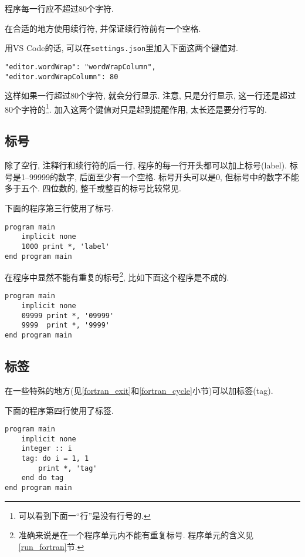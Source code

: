\begin{principle}\label{fortran_no_more_than_80}
    程序每一行应不超过$80$个字符.
\end{principle}

\begin{principle}
    在合适的地方使用续行符, 并保证续行符前有一个空格.
\end{principle}

用VS Code的话, 可以在\verb|settings.json|里加入下面这两个键值对.
\begin{verbatim}
"editor.wordWrap": "wordWrapColumn",
"editor.wordWrapColumn": 80
\end{verbatim}
这样如果一行超过80个字符, 就会分行显示. 注意, 只是分行显示, 这一行还是超过80个字符的\footnote{
    可以看到下面一``行''是没有行号的.
}. 加入这两个键值对只是起到提醒作用, 太长还是要分行写的.

\subsection{标号}

除了空行, 注释行和续行符的后一行, 程序的每一行开头都可以加上标号(label). 标号是1--99999的数字, 后面至少有一个空格. 标号开头可以是0, 但标号中的数字不能多于五个. 四位数的, 整千或整百的标号比较常见.

下面的程序第三行使用了标号.
\begin{verbatim}
program main
    implicit none
    1000 print *, 'label'
end program main
\end{verbatim}

在程序中显然不能有重复的标号\footnote{
    准确来说是在一个程序单元内不能有重复标号. 程序单元的含义见\ref{run_fortran}节.
}, 比如下面这个程序是不成的.\begin{verbatim}
program main
    implicit none
    09999 print *, '09999'
    9999  print *, '9999'
end program main
\end{verbatim}

\subsection{标签}

在一些特殊的地方(见\ref{fortran_exit}和\ref{fortran_cycle}小节)可以加标签(tag). 

下面的程序第四行使用了标签.
\begin{verbatim}
program main
    implicit none
    integer :: i
    tag: do i = 1, 1
        print *, 'tag'
    end do tag
end program main
\end{verbatim}

